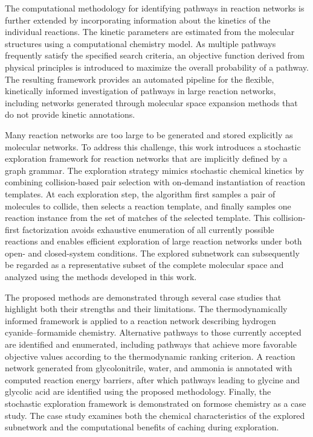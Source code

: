 The computational methodology for identifying pathways in reaction networks is further extended by incorporating information about the kinetics of the individual reactions. The kinetic parameters are estimated from the molecular structures using a computational chemistry model. As multiple pathways frequently satisfy the specified search criteria, an objective function derived from physical principles is introduced to maximize the overall probability of a pathway. The resulting framework provides an automated pipeline for the flexible, kinetically informed investigation of pathways in large reaction networks, including networks generated through molecular space expansion methods that do not provide kinetic annotations.

Many reaction networks are too large to be generated and stored explicitly as molecular networks. To address this challenge, this work introduces a stochastic exploration framework for reaction networks that are implicitly defined by a graph grammar. The exploration strategy mimics stochastic chemical kinetics by combining collision-based pair selection with on-demand instantiation of reaction templates. At each exploration step, the algorithm first samples a pair of molecules to collide, then selects a reaction template, and finally samples one reaction instance from the set of matches of the selected template. This collision-first factorization avoids exhaustive enumeration of all currently possible reactions and enables efficient exploration of large reaction networks under both open- and closed-system conditions. The explored subnetwork can subsequently be regarded as a representative subset of the complete molecular space and analyzed using the methods developed in this work.

The proposed methods are demonstrated through several case studies that highlight both their strengths and their limitations. The thermodynamically informed framework is applied to a reaction network describing hydrogen cyanide–formamide chemistry. Alternative pathways to those currently accepted are identified and enumerated, including pathways that achieve more favorable objective values according to the thermodynamic ranking criterion. A reaction network generated from glycolonitrile, water, and ammonia is annotated with computed reaction energy barriers, after which pathways leading to glycine and glycolic acid are identified using the proposed methodology. Finally, the stochastic exploration framework is demonstrated on formose chemistry as a case study. The case study examines both the chemical characteristics of the explored subnetwork and the computational benefits of caching during exploration.
